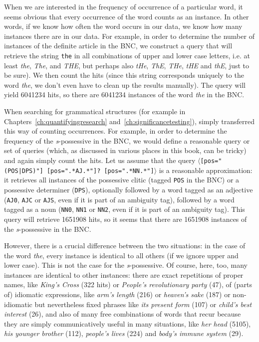 When we are interested in the frequency  of occurrence of a particular word, it seems obvious that every occurrence of the word counts as an instance. In other words, if we know how often the word occurs in our data, we know how many instances there are in our data. For example, in order to determine the number of instances of the definite article  in the BNC,  we construct a query that will retrieve  the string \texttt{the} in all combinations of upper and lower case letters, i.e. at least \textit{the}, \textit{The}, and \textit{THE}, but perhaps also \textit{tHe}, \textit{ThE}, \textit{THe}, \textit{tHE} and \textit{thE}, just to be sure). We then count the hits (since this string corresponds uniquely to the word \textit{the}, we don't even have to clean up the results manually).  The query will yield \num{6041234} hits, so there are \num{6041234} instances of the word \textit{the} in the  BNC.

When searching for grammatical  structures (for example in Chapters~\ref{ch:quantifyingresearch} and~\ref{ch:significancetesting}), simply transferred this way of counting occurrences. For example, in order to determine the frequency  of the \textit{s}-possessive  in the BNC,  we would define a reasonable query or set of queries (which, as discussed in various places in this book, can be tricky) and again simply count the hits.  Let us assume that the query $\langle$\texttt{[pos="(POS|DPS)"] [pos=".*AJ.*"]? [pos=".*NN.*"]}$\rangle$ is a reasonable approximation: it retrieves  all instances of the possessive clitic  (tagged \texttt{POS} in the BNC)  or a possessive determiner  (\texttt{DPS}), optionally followed by a word tagged  as an adjective  (\texttt{AJ0}, \texttt{AJC} or \texttt{AJS}, even if it is part of an ambiguity  tag), followed by a word tagged as a noun  (\texttt{NN0}, \texttt{NN1} or \texttt{NN2}, even if it is part of an ambiguity tag). This query will retrieve \num{1651908} hits, so it seems that there are \num{1651908} instances of the \textit{s}-possessive  in the  BNC.

However, there is a crucial difference between the two situations: in the case of the word \textit{the}, every instance is identical to all others (if we ignore upper and lower case). This is not the case for the \textit{s}-possessive. Of course, here, too, many instances are identical to other instances: there are exact repetitions of proper names, like \textit{King's Cross} (322 hits) or \textit{People's revolutionary party} (47), of (parts of) idiomatic  expressions, like \textit{arm's length} (216) or \textit{heaven's sake} (187) or non\hyp{}idiomatic but nevertheless fixed phrases like \textit{its present form} (107) or \textit{child's best interest} (26), and also of many free combinations of words that recur because they are simply communicatively useful in many situations, like \textit{her head} (5105), \textit{his younger brother} (112), \textit{people's lives} (224) and \textit{body's immune system} (29).

